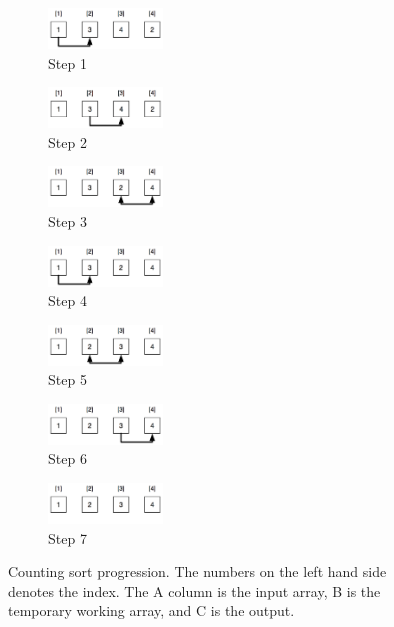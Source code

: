 \documentclass[12pt]{article}
\begin{document}
	
	\begin{figure}[H]
		
		\begin{subfigure}{0.24\textwidth}
			\includegraphics[width=1.2in]{bubble-1.png} 
			\caption{Step 1}
			\label{fig:bubblecount1}
		\end{subfigure}
		\begin{subfigure}{0.24\textwidth}
			\includegraphics[width=1.2in]{bubble-2.png}
			\caption{Step 2}
			\label{fig:bubblecount2}
		\end{subfigure}
		\begin{subfigure}{0.24\textwidth}
			\includegraphics[width=1.2in]{bubble-3.png}
			\caption{Step 3}
			\label{fig:bubblecount3}
		\end{subfigure}
		\begin{subfigure}{0.24\textwidth}
			\includegraphics[width=1.2in]{bubble-4.png}
			\caption{Step 4}
			\label{fig:bubblecount4}
		\end{subfigure}
		\begin{subfigure}{0.24\textwidth}
			\includegraphics[width=1.2in]{bubble-5.png}
			\caption{Step 5}
			\label{fig:bubblecount5}
		\end{subfigure}
		\begin{subfigure}{0.24\textwidth}
			\includegraphics[width=1.2in]{bubble-6.png}
			\caption{Step 6}
			\label{fig:bubblecount6}
		\end{subfigure}
		\begin{subfigure}{0.24\textwidth}
			\includegraphics[width=1.2in]{bubble-7.png}
			\caption{Step 7}
			\label{fig:bubblecount7}
		\end{subfigure}
		
		\caption{Counting sort progression. The numbers on the left hand side denotes the index. The A column is the input array, B is the temporary working array, and C is the output.}
		\label{fig:bubleSorting}
	\end{figure}
	
\end{document}
